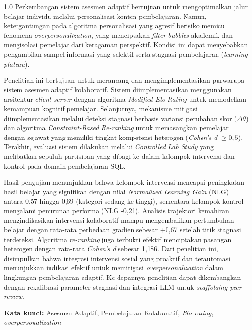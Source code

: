 \begin{spacing}{1.0}
Perkembangan sistem asesmen adaptif bertujuan untuk mengoptimalkan jalur belajar individu melalui personalisasi konten pembelajaran. Namun, ketergantungan pada algoritma personalisasi yang agresif berisiko memicu fenomena \textit{overpersonalization}, yang menciptakan \textit{filter bubbles} akademik dan mengisolasi pemelajar dari keragaman perspektif. Kondisi ini dapat menyebabkan pengambilan sampel informasi yang selektif serta stagnasi pembelajaran (\textit{learning plateau}).

Penelitian ini bertujuan untuk merancang dan mengimplementasikan purwarupa sistem asesmen adaptif kolaboratif. Sistem diimplementasikan menggunakan arsitektur \textit{client-server} dengan algoritma \textit{Modified Elo Rating} untuk memodelkan kemampuan kognitif pemelajar. Selanjutnya, mekanisme mitigasi diimplementasikan melalui deteksi stagnasi berbasis variansi perubahan skor ($\Delta\theta$) dan algoritma \textit{Constraint-Based Re-ranking} untuk memasangkan pemelajar dengan sejawat yang memiliki tingkat kompetensi heterogen (\textit{Cohen's d} $\geq 0{,}5$). Terakhir, evaluasi sistem dilakukan melalui \textit{Controlled Lab Study} yang melibatkan sepuluh partisipan yang dibagi ke dalam kelompok intervensi dan kontrol pada domain pembelajaran SQL.

Hasil pengujian menunjukkan bahwa kelompok intervensi mencapai peningkatan hasil belajar yang signifikan dengan nilai \textit{Normalized Learning Gain} (NLG) antara 0,57 hingga 0,69 (kategori sedang ke tinggi), sementara kelompok kontrol mengalami penurunan performa (NLG -0,21). Analisis trajektori kemahiran mengindikasikan intervensi kolaboratif mampu mengembalikan pertumbuhan belajar dengan rata-rata perbedaan gradien sebesar +0,67 setelah titik stagnasi terdeteksi. Algoritma \textit{re-ranking} juga terbukti efektif menciptakan pasangan heterogen dengan rata-rata \textit{Cohen's d} sebesar 1,186. Dari penelitian ini, disimpulkan bahwa integrasi intervensi sosial yang proaktif dan terautomasi menunjukkan indikasi efektif untuk memitigasi \textit{overpersonalization} dalam lingkungan pembelajaran adaptif. Ke depannya penelitian dapat dikembangkan dengan rekalibrasi parameter stagnasi dan integrasi LLM untuk \textit{scaffolding peer review}. 

\vspace{0.4cm}
\noindent \textbf{Kata kunci:} Asesmen Adaptif, Pembelajaran Kolaboratif, \textit{Elo rating}, \textit{overpersonalization}\par
\end{spacing}

